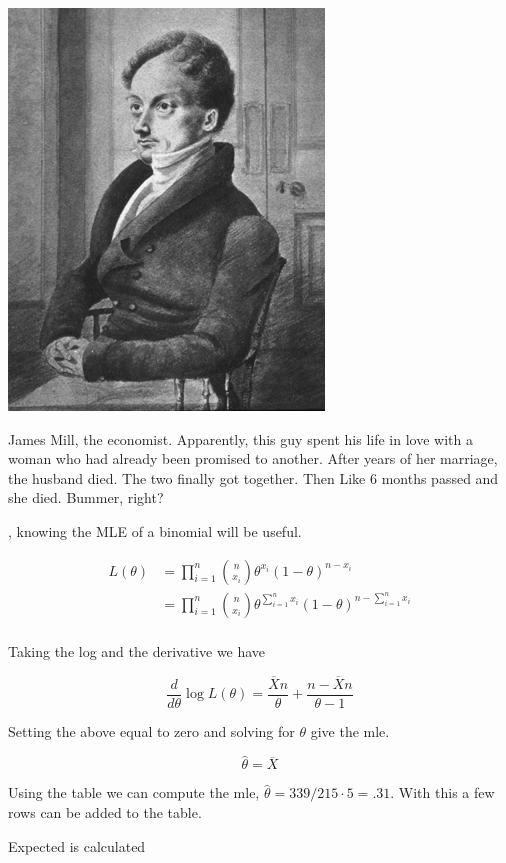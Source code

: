 \documentclass{tufte-book}
\theoremstyle{mytheoremstyle}
\theoremstyle{mylemstyle}
\theoremstyle{mydefstyle}
\begin{document}
\begin{marginfigure}
\includegraphics{James_Mill}
\caption{James Mill, the economist.  Apparently, this guy spent his life in love with a woman who had already been promised to another.  After years of her marriage, the husband died.  The two finally got together.  Then Like 6 months passed and she died.  Bummer, right?}
\end{marginfigure}

, knowing the MLE of a binomial will be useful.

\begin{align*}
L(\theta) &= \prod_{i=1}^n \binom{n}{x_i} \theta^{x_i}(1-\theta)^{n-x_i} \\
&= \prod_{i=1}^n \binom{n}{x_i} \theta^{\sum_{i=1}^n x_i}(1-\theta)^{n- \sum_{i=1}^n x_i}\\
\end{align*}

Taking the log and the derivative we have

\[ \frac{d}{d\theta} \log L(\theta) = \frac{\overline{X}n}{\theta} + \frac{n- \overline{X}n}{\theta - 1} \]

Setting the above equal to zero and solving for $\theta$ give the mle.

\[ \hat{\theta} = \overline{X} \]

Using the table we can compute the mle, $\hat{\theta} = 339/215\cdot 5 = .31$.  With this a few rows can be added to the table.

Expected is calculated
\end{document}
